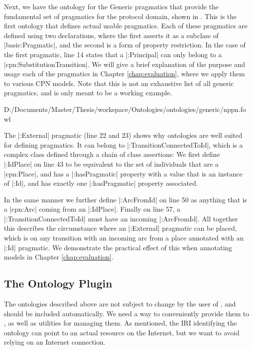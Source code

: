 Next, we have the ontology for the Generic pragmatics that provide the
fundamental set of pragmatics for the protocol domain, shown in
. This is the first ontology that defines actual usable
pragmatics. Each of these pragmatics are defined using two declarations, where
the first asserts it as a subclass of |basic:Pragmatic|, and the second is a
form of property restriction. In the case of the first pragmatic, line 14 states
that a |:Principal| can only belong to a |cpn:SubstitutionTransition|. We will
give a brief explanation of the purpose and usage each of the pragmatics in 
Chapter \ref{chap:evaluation}, where we apply them to various CPN models. Note
that this is not an exhaustive list of all generic pragmatics, and is only meant
to be a working example.


{D:/Documents/Master/Thesis/workspace/Ontologies/ontologies/generic/nppn.fowl}

The |:External| pragmatic (line 22 and 23) shows why ontologies are well suited
for defining pragmatics. It can belong to |:TransitionConnectedToId|, which is a
complex class defined through a chain of class assertions: We first define
|:IdPlace| on line 43 to be equivalent to the set of individuals that are a |cpn:Place|, and
has a |:hasPragmatic| property with a value that is an instance of |:Id|, and
has exactly one |:hasPragmatic| property associated. 

In the same manner we
further define |:ArcFromId| on line 50 as anything that is a |cpn:Arc| coming
from an |:IdPlace|. Finally on line 57, a |:TransitionConnectedToId| must have
an incoming |:ArcFromId|. All together this describes the circumstance where an
|:External| pragmatic can be placed, which is on any transition with an incoming
arc from a place annotated with an |:Id| pragmatic. We demonstrate the practical
effect of this when annotating models in Chapter \ref{chap:evaluation}.

\subsection{The Ontology Plugin}\label{sec:ontologiesPlugin}
The ontologies described above are not subject to change by the user of
\thename{}, and should be included automatically. We need a
way to conveniently provide them to \thename{}, as well as utilities for managing
them. As mentioned, the IRI identifying the ontology can point to an actual
resource on the Internet, but we want to avoid relying on an Internet
connection. 


